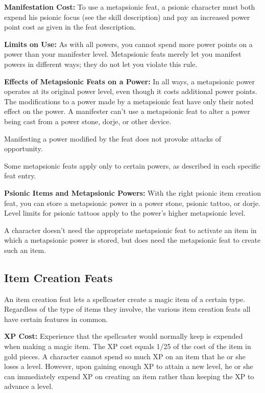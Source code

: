\textbf{Manifestation Cost:} To use a metapsionic feat, a psionic character must both expend his psionic focus (see the  skill description) and pay an increased power point cost as given in the feat description.

\textbf{Limits on Use:} As with all powers, you cannot spend more power points on a power than your manifester level. Metapsionic feats merely let you manifest powers in different ways; they do not let you violate this rule.

\textbf{Effects of Metapsionic Feats on a Power:} In all ways, a metapsionic power operates at its original power level, even though it costs additional power points. The modifications to a power made by a metapsionic feat have only their noted effect on the power. A manifester can't use a metapsionic feat to alter a power being cast from a power stone, dorje, or other device.

Manifesting a power modified by the  feat does not provoke attacks of opportunity.

Some metapsionic feats apply only to certain powers, as described in each specific feat entry.

\textbf{Psionic Items and Metapsionic Powers:} With the right psionic item creation feat, you can store a metapsionic power in a power stone, psionic tattoo, or dorje. Level limits for psionic tattoos apply to the power's higher metapsionic level.

A character doesn't need the appropriate metapsionic feat to activate an item in which a metapsionic power is stored, but does need the metapsionic feat to create such an item.

\subsection{Item Creation Feats}
An item creation feat lets a spellcaster create a magic item of a certain type. Regardless of the type of items they involve, the various item creation feats all have certain features in common.

\textbf{XP Cost:} Experience that the spellcaster would normally keep is expended when making a magic item. The XP cost equals 1/25 of the cost of the item in gold pieces. A character cannot spend so much XP on an item that he or she loses a level. However, upon gaining enough XP to attain a new level, he or she can immediately expend XP on creating an item rather than keeping the XP to advance a level.

